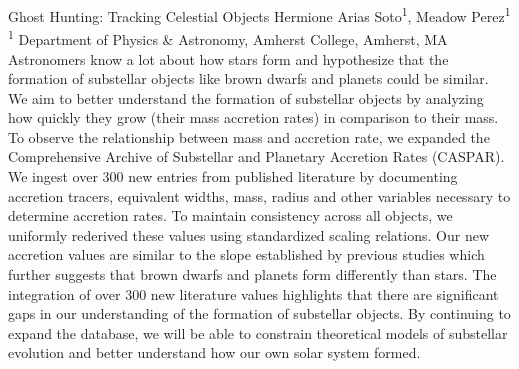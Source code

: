 \makeabstract
    {
    Ghost Hunting: Tracking Celestial Objects
    }
    {
    Hermione Arias Soto\textsuperscript{1}, Meadow Perez\textsuperscript{1}
    }
    {
    \textsuperscript{1} Department of Physics \& Astronomy, Amherst College, Amherst, MA
    }
    {
    Astronomers know a lot about how stars form and hypothesize that the formation of substellar objects like brown dwarfs and planets could be similar. We aim to better understand the formation of substellar objects by analyzing how quickly they grow (their mass accretion rates) in comparison to their mass. 
    }
    {
    To observe the relationship between mass and accretion rate, we expanded the Comprehensive Archive of Substellar and Planetary Accretion Rates (CASPAR). We ingest over 300 new entries from published literature by documenting accretion tracers, equivalent widths, mass, radius and other variables necessary to determine accretion rates. To maintain consistency across all objects, we uniformly rederived these values using standardized scaling relations.
    }
    {
     Our new accretion values are similar to the slope established by previous studies which further suggests that brown dwarfs and planets form differently than stars.
    }
    {
    The integration of over 300 new literature values highlights that there are significant gaps in our understanding of the formation of substellar objects. By continuing to expand the database, we will be able to constrain theoretical models of substellar evolution and better understand how our own solar system formed.
    }

    \newpage
    
